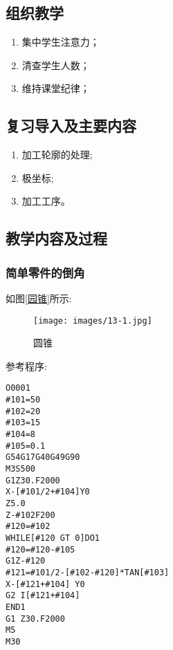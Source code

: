 \jxhj{%
	}

\makeshouye %

\subsection{组织教学}
\begin{enumerate}[\hspace{2em}1、]
	\item 集中学生注意力；
	\item 清查学生人数；
	\item 维持课堂纪律；
\end{enumerate}
\subsection{复习导入及主要内容}
\begin{enumerate}[1、]
	\item 加工轮廓的处理;
	\item 极坐标;
	\item 加工工序。
\end{enumerate}


\subsection{教学内容及过程}

\subsubsection{简单零件的倒角}
如图\ref{园锥}所示:
\begin{figure}[!hbtp]
	\centering	\texttt{[image: images/13-1.jpg]}
	\caption{圆锥} \label{圆锥}
\end{figure}
参考程序:
\begin{lstlisting}
O0001
#101=50
#102=20
#103=15
#104=8
#105=0.1
G54G17G40G49G90
M3S500
G1Z30.F2000
X-[#101/2+#104]Y0
Z5.0
Z-#102F200
#120=#102
WHILE[#120 GT 0]DO1
#120=#120-#105
G1Z-#120
#121=#101/2-[#102-#120]*TAN[#103]
X-[#121+#104] Y0
G2 I[#121+#104]
END1
G1 Z30.F2000
M5
M30
\end{lstlisting}
